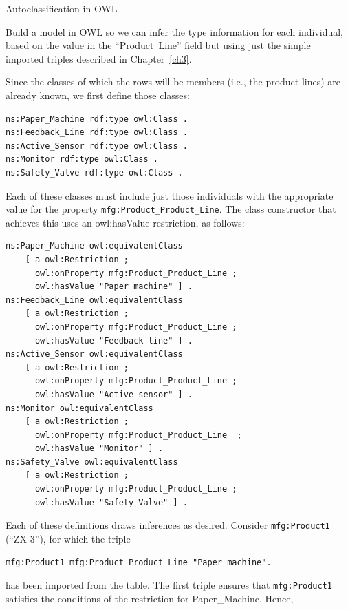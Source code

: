 \begin{challenge}{Autoclassification in OWL}
\label{ch:Autoclass}

Build a model in OWL so we can infer the type information for each
individual, based on the value in the ``Product\ Line'' 
field but using just the simple imported triples described in
Chapter~\ref{ch3}.

\solution

Since the classes of which the rows will be members (i.e., the product
lines) are already known, we first define those classes:

\begin{lstlisting}
ns:Paper_Machine rdf:type owl:Class .
ns:Feedback_Line rdf:type owl:Class .
ns:Active_Sensor rdf:type owl:Class .
ns:Monitor rdf:type owl:Class .
ns:Safety_Valve rdf:type owl:Class .
\end{lstlisting}

Each of these classes must include just those individuals with the
appropriate value for the property \texttt{mfg:Product\_Product\_Line}. The class
constructor that achieves this uses an owl:hasValue restriction, as
follows:

\begin{lstlisting}
ns:Paper_Machine owl:equivalentClass
    [ a owl:Restriction ;
      owl:onProperty mfg:Product_Product_Line ;
      owl:hasValue "Paper machine" ] .
ns:Feedback_Line owl:equivalentClass
    [ a owl:Restriction ;
      owl:onProperty mfg:Product_Product_Line ;
      owl:hasValue "Feedback line" ] .
ns:Active_Sensor owl:equivalentClass
    [ a owl:Restriction ;
      owl:onProperty mfg:Product_Product_Line ;
      owl:hasValue "Active sensor" ] .
ns:Monitor owl:equivalentClass
    [ a owl:Restriction ;
      owl:onProperty mfg:Product_Product_Line  ;
      owl:hasValue "Monitor" ] .
ns:Safety_Valve owl:equivalentClass
    [ a owl:Restriction ;
      owl:onProperty mfg:Product_Product_Line ;
      owl:hasValue "Safety Valve" ] .
\end{lstlisting}

Each of these definitions draws inferences as desired. Consider
\texttt{mfg:Product1} (``ZX-3''), for which the triple

\begin{lstlisting}
mfg:Product1 mfg:Product_Product_Line "Paper machine".
\end{lstlisting}

has been imported from the table. The first triple ensures that
\texttt{mfg:Product1} satisfies the conditions of the restriction for
Paper\_Machine. Hence,


\end{challenge}

